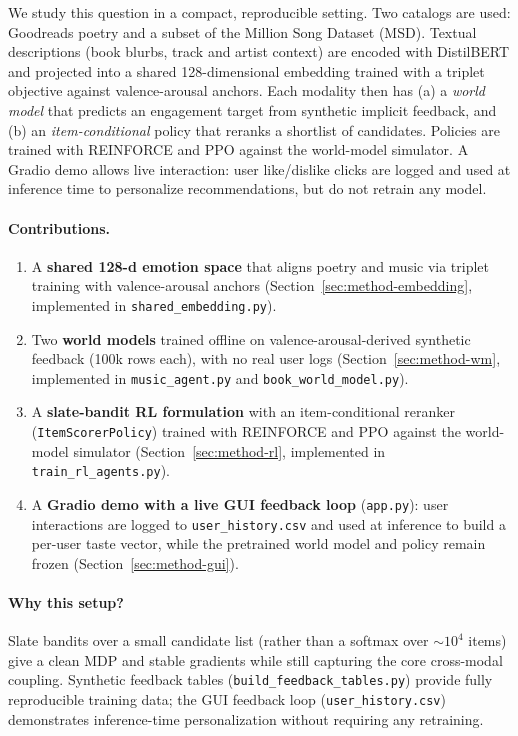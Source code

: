 \documentclass[11pt]{article}
\begin{document}
We study this question in a compact, reproducible setting. Two catalogs
are used: Goodreads poetry and a subset of the Million Song Dataset
(MSD). Textual descriptions (book blurbs, track and artist context) are
encoded with DistilBERT and projected into a shared 128-dimensional
embedding trained with a triplet objective against valence-arousal
anchors. Each modality then has (a) a \emph{world model} that predicts
an engagement target from synthetic implicit feedback, and (b) an
\emph{item-conditional} policy that reranks a shortlist of candidates.
Policies are trained with REINFORCE and PPO against the world-model
simulator. A Gradio demo allows live interaction: user like/dislike
clicks are logged and used at inference time to personalize
recommendations, but do not retrain any model.

\paragraph{Contributions.}
\begin{enumerate}[leftmargin=*, itemsep=2pt]
    \item A \textbf{shared 128-d emotion space} that aligns poetry and
    music via triplet training with valence-arousal anchors
    (Section~\ref{sec:method-embedding}, implemented in
    \texttt{shared\_embedding.py}).
    \item Two \textbf{world models} trained offline on
    valence-arousal-derived synthetic feedback (100k rows each), with no
    real user logs (Section~\ref{sec:method-wm}, implemented in
    \texttt{music\_agent.py} and \texttt{book\_world\_model.py}).
    \item A \textbf{slate-bandit RL formulation} with an
    item-conditional reranker (\texttt{ItemScorerPolicy}) trained with
    REINFORCE and PPO against the world-model simulator
    (Section~\ref{sec:method-rl}, implemented in
    \texttt{train\_rl\_agents.py}).
    \item A \textbf{Gradio demo with a live GUI feedback loop}
    (\texttt{app.py}): user interactions are logged to
    \texttt{user\_history.csv} and used at inference to build a
    per-user taste vector, while the pretrained world model and policy
    remain frozen (Section~\ref{sec:method-gui}).
\end{enumerate}

\paragraph{Why this setup?}
Slate bandits over a small candidate list (rather than a softmax over
$\sim\!10^4$ items) give a clean MDP and stable gradients while still
capturing the core cross-modal coupling. Synthetic feedback tables
(\texttt{build\_feedback\_tables.py}) provide fully reproducible
training data; the GUI feedback loop (\texttt{user\_history.csv})
demonstrates inference-time personalization without requiring any
retraining.
\end{document}
